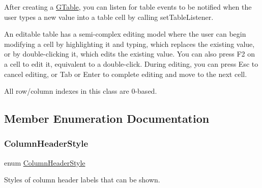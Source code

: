 After creating a \mbox{\hyperlink{classGTable}{G\+Table}}, you can listen for table events to be notified when the user types a new value into a table cell by calling set\+Table\+Listener.

An editable table has a semi-\/complex editing model where the user can begin modifying a cell by highlighting it and typing, which replaces the existing value, or by double-\/clicking it, which edits the existing value. You can also press F2 on a cell to edit it, equivalent to a double-\/click. During editing, you can press Esc to cancel editing, or Tab or Enter to complete editing and move to the next cell.

All row/column indexes in this class are 0-\/based. 

\subsection{Member Enumeration Documentation}
\mbox{\label{classGTable_a060cff504451bbb98530e64e936e2671}} 
\subsubsection{\texorpdfstring{Column\+Header\+Style}{ColumnHeaderStyle}}
{\footnotesize\ttfamily enum \mbox{\hyperlink{classGTable_a060cff504451bbb98530e64e936e2671}{Column\+Header\+Style}}}



Styles of column header labels that can be shown. 

